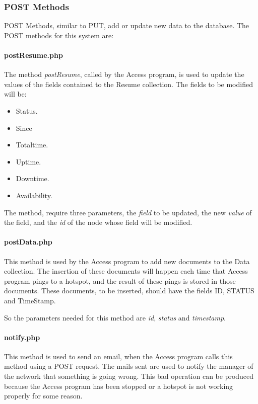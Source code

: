 \documentclass[12pt, a4paper,twoside]{tesi_upf}
\begin{document}
            \subsubsection{POST Methods}
            POST Methods, similar to PUT, add or update new data to the database. The POST methods for this system are:
            
                \paragraph{postResume.php}
                
                The method \textit{postResume}, called by the Access program, is used to update the values of the fields contained to the Resume collection. The fields to be modified will be: 
                \begin{itemize}
                \item Status.
                \item Since
                \item Totaltime.
                \item Uptime.
                \item Downtime.
                \item Availability.
                \end{itemize}
                
                The method, require three parameters, the \textit{field} to be updated, the new \textit{value} of the field, and the \textit{id} of the node whose field will be modified.\\
                
                
                \paragraph{postData.php}
                This method is used by the Access program to add new documents to the Data collection. The insertion of these documents will happen each time that Access program pings to a hotspot, and the result of these pings is stored in those documents. These documents, to be inserted, should have the fields ID, STATUS and TimeStamp. 
                
                So the parameters needed for this method are \textit{id}, \textit{status} and \textit{timestamp}.\\
                
                \paragraph{notify.php}
                This method is used to send an email, when the Access program calls this method using a POST request. The mails sent are used to notify the manager of the network that something is going wrong. This bad operation can be produced because the Access program has been stopped or a hotspot is not working properly for some reason.
                
\end{document}
